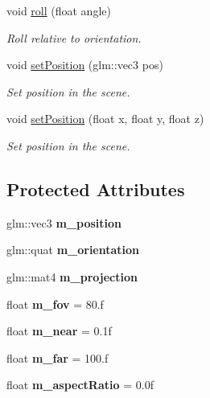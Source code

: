 \begin{DoxyCompactItemize}
void \hyperlink{classce_1_1graphics_1_1_camera_a3e037adde223d673eb581fdbc536e29c}{roll} (float angle)
\begin{DoxyCompactList}\small\item\em Roll relative to orientation. \end{DoxyCompactList}\item 
void \hyperlink{classce_1_1graphics_1_1_camera_a03003f6beb426e19d497222977e6568a}{set\+Position} (glm\+::vec3 pos)
\begin{DoxyCompactList}\small\item\em Set position in the scene. \end{DoxyCompactList}\item 
void \hyperlink{classce_1_1graphics_1_1_camera_ad993b93d1a746100d5f014070abb438b}{set\+Position} (float x, float y, float z)
\begin{DoxyCompactList}\small\item\em Set position in the scene. \end{DoxyCompactList}\end{DoxyCompactItemize}
\subsection*{Protected Attributes}
\begin{DoxyCompactItemize}
\item 
\mbox{\label{classce_1_1graphics_1_1_camera_a6da1decf9ab143cc3ab033056b8d348c}} 
glm\+::vec3 {\bfseries m\+\_\+position}
\item 
\mbox{\label{classce_1_1graphics_1_1_camera_a97e02246f2b0bfb394db00bb0a060eef}} 
glm\+::quat {\bfseries m\+\_\+orientation}
\item 
\mbox{\label{classce_1_1graphics_1_1_camera_a461d9ce1b36810b30856b7e09a8aeeb1}} 
glm\+::mat4 {\bfseries m\+\_\+projection}
\item 
\mbox{\label{classce_1_1graphics_1_1_camera_ae90940a9bc20e861b2d49b3652e1577c}} 
float {\bfseries m\+\_\+fov} = 80.f
\item 
\mbox{\label{classce_1_1graphics_1_1_camera_abadd16f3b450f915c7aa2ef9a9ae8d61}} 
float {\bfseries m\+\_\+near} = 0.\+1f
\item 
\mbox{\label{classce_1_1graphics_1_1_camera_a5ef90582c3913d57709844d55905c420}} 
float {\bfseries m\+\_\+far} = 100.f
\item 
\mbox{\label{classce_1_1graphics_1_1_camera_a99216c4952993ed908ae04ba6480872c}} 
float {\bfseries m\+\_\+aspect\+Ratio} = 0.\+0f
\end{DoxyCompactItemize}


